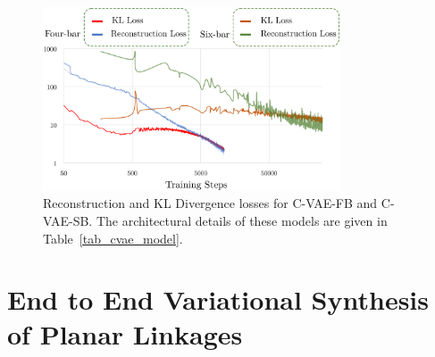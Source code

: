 \begin{figure}
\centering
\includegraphics[width=250pt]{jmd-19/figure/fig_cvae_train_loss.eps}
  \caption{Reconstruction and KL Divergence losses for C-VAE-FB and C-VAE-SB. The architectural details of these models are given in Table~\ref{tab_cvae_model}.}
\label{fig_cvae_training_loss}
\end{figure}

\section{End to End Variational Synthesis of Planar Linkages}

